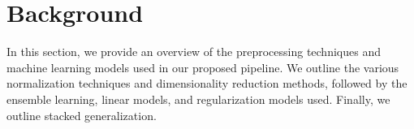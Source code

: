 \section{Background}\label{sec:background}
In this section, we provide an overview of the preprocessing techniques and machine learning models used in our proposed pipeline.
We outline the various normalization techniques and dimensionality reduction methods, followed by the ensemble learning, linear models, and regularization models used.
Finally, we outline stacked generalization.



